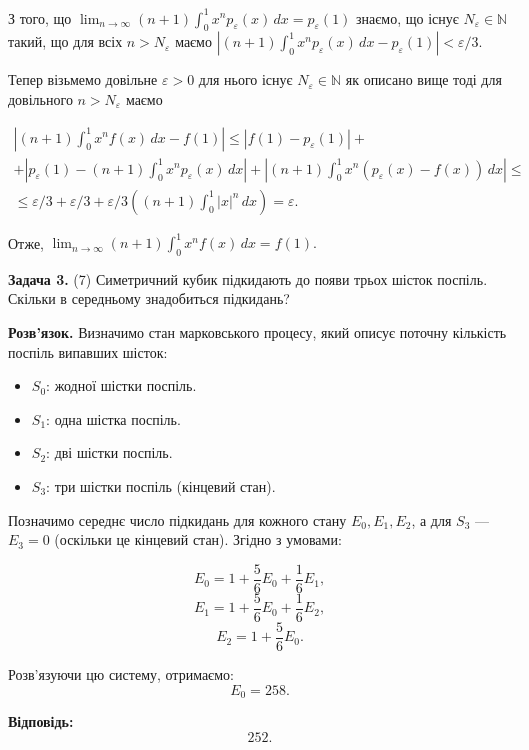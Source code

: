 \documentclass{article}
\begin{document}
З того, що $\lim_{n \to \infty} (n + 1)  \int_{0}^{1} x^n p_\varepsilon(x) \, dx = p_\varepsilon(1)$ знаємо, що існує $N_\varepsilon \in \mathbb{N}$ такий, що для всіх $n>N_\varepsilon$ маємо $\left|(n + 1) \int_{0}^{1} x^n p_\varepsilon(x) \, dx - p_\varepsilon (1)\right| < \varepsilon/3$.

Тепер візьмемо довільне $\varepsilon >0$ для нього існує $N_\varepsilon \in \mathbb{N}$ як описано вище тоді для довільного $n > N_\varepsilon$ маємо 

\begin{multline*}
\left|(n + 1)  \int_{0}^{1} x^n f(x)\, dx - f(1)\right| \leq \left|f(1)-p_\varepsilon (1)\right| + \\ +\left|p_\varepsilon (1)  - (n + 1)  \int_{0}^{1} x^n p_\varepsilon (x)\, dx\right| 
+ \left|(n + 1)  \int_{0}^{1} x^n (p_\varepsilon (x)-f(x))\, dx\right| \leq \\ 
\leq \varepsilon/3 + \varepsilon/3 +\varepsilon/3 \left( (n + 1)  \int_{0}^{1} |x|^n\, dx \right) = \varepsilon.
\end{multline*}

Отже, $
\lim_{n \to \infty} (n + 1) \int_{0}^{1} x^n f(x) \, dx = f(1).
$

\bigskip

\noindent\textbf{Задача 3.} (7) Симетричний кубик підкидають до появи трьох шісток поспіль. Скільки в середньому знадобиться підкидань?

\textbf{Розв’язок.} Визначимо стан марковського процесу, який описує поточну кількість поспіль випавших шісток:
\begin{itemize}
    \item \( S_0 \): жодної шістки поспіль.
    \item \( S_1 \): одна шістка поспіль.
    \item \( S_2 \): дві шістки поспіль.
    \item \( S_3 \): три шістки поспіль (кінцевий стан).
\end{itemize}

Позначимо середнє число підкидань для кожного стану \( E_0, E_1, E_2 \), а для \( S_3 \) — \( E_3 = 0 \) (оскільки це кінцевий стан). Згідно з умовами:

\[
E_0 = 1 + \frac{5}{6}E_0 + \frac{1}{6}E_1,
\]
\[
E_1 = 1 + \frac{5}{6}E_0 + \frac{1}{6}E_2,
\]
\[
E_2 = 1 + \frac{5}{6}E_0.
\]

Розв’язуючи цю систему, отримаємо:
\[
E_0 = 258.
\]

\textbf{Відповідь:}  
\[
\boxed{252}.
\]
\end{document}
